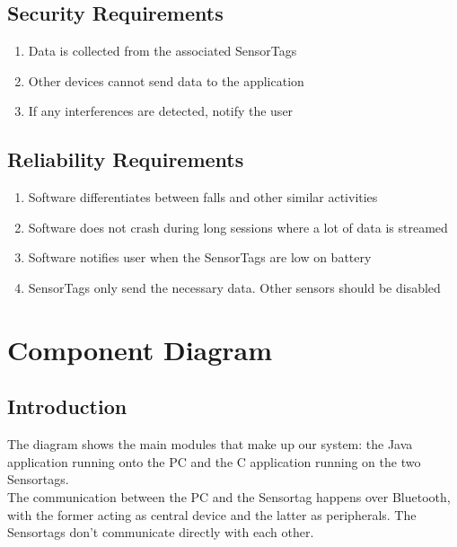 \documentclass[conference,12pt]{IEEETran}
\begin{document}
\subsection{Security Requirements}

	\begin{enumerate}
		\item Data is collected from the associated SensorTags
		\item Other devices cannot send data to the application
		\item If any interferences are detected, notify the user
	\end{enumerate}


\subsection{Reliability Requirements}

	\begin{enumerate}
		\item Software differentiates between falls and other similar activities
		\item Software does not crash during long sessions where a lot of data is streamed
		\item Software notifies user when the SensorTags are low on battery
		\item SensorTags only send the necessary data. Other sensors should be disabled
	\end{enumerate}

	
\section{Component Diagram}
\subsection{Introduction}

The diagram shows the main modules that make up our system: the Java application running onto the PC and the C application running on the two Sensortags.\\
The communication between the PC and the Sensortag happens over Bluetooth, with the former acting as central device and the latter as peripherals. The Sensortags don’t communicate directly with each other.
\end{document}
